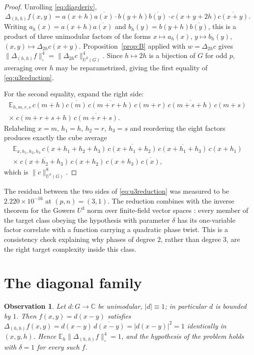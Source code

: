 \documentclass[11pt]{article}
\newtheorem{observation}{Observation}
\theoremstyle{remark}
\begin{document}
\begin{proof}
Unrolling \eqref{eq:diagderiv},
\[
\Delta_{(h,h)}f(x,y)
=a(x+h)\overline{a(x)}\cdot b(y+h)\overline{b(y)}
\cdot c(x+y+2h)\overline{c(x+y)} .
\]
Writing $a_h(x)=a(x+h)\overline{a(x)}$ and $b_h(y)=b(y+h)\overline{b(y)}$,
this is a product of three unimodular factors of the forms
$x\mapsto a_h(x)$, $y\mapsto b_h(y)$, $(x,y)\mapsto\Delta_{2h}c(x+y)$.
Proposition~\ref{prop:B} applied with $w=\Delta_{2h}c$ gives
$\|\Delta_{(h,h)}f\|_\square^4=\|\Delta_{2h}c\|_{U^2(G)}^4$. Since
$h\mapsto 2h$ is a bijection of $G$ for odd $p$, averaging over $h$ may be
reparametrized, giving the first equality of \eqref{eq:u3reduction}.

For the second equality, expand the right side:
\begin{multline*}
\mathbb{E}_{h,m,r,s}\,
c(m+h)\overline{c(m)}\,
\overline{c(m+r+h)}\,c(m+r)\,
\overline{c(m+s+h)}\,c(m+s)\\
\times\; c(m+r+s+h)\,\overline{c(m+r+s)} .
\end{multline*}
Relabeling $x=m$, $h_1=h$, $h_2=r$, $h_3=s$ and reordering the eight
factors produces exactly the cube average
\begin{multline*}
\mathbb{E}_{x,h_1,h_2,h_3}\,
c(x+h_1+h_2+h_3)\,\overline{c(x+h_1+h_2)}\,
\overline{c(x+h_1+h_3)}\,c(x+h_1)\\
\times\;\overline{c(x+h_2+h_3)}\,c(x+h_2)\,c(x+h_3)\,\overline{c(x)},
\end{multline*}
which is $\|c\|_{U^3(G)}^8$.
\end{proof}

The residual between the two sides of \eqref{eq:u3reduction} was measured to
be $2.220\times10^{-16}$ at $(p,n)=(3,1)$. The reduction combines with the
inverse theorem for the Gowers $U^3$ norm over finite-field vector spaces
\cite{greentao2010}: every member of the target class obeying the hypothesis
with parameter $\delta$ has its one-variable factor correlate with a
function carrying a quadratic phase twist. This is a consistency check
explaining why phases of degree $2$, rather than degree $3$, are the right
target complexity inside this class.

\section{The diagonal family}\label{sec:diagonal}

\begin{observation}\label{obs:C}
Let $d:G\to\mathbb{C}$ be unimodular, $|d|\equiv1$; in particular $d$ is
bounded by $1$. Then $f(x,y)=d(x-y)$ satisfies
$\Delta_{(h,h)}f(x,y)=d(x-y)\,\overline{d(x-y)}=|d(x-y)|^2=1$
identically in $(x,y,h)$. Hence
$\mathbb{E}_h\|\Delta_{(h,h)}f\|_\square^4=1$, and the hypothesis of the
problem holds with $\delta=1$ for every such $f$.
\end{observation}
\end{document}
